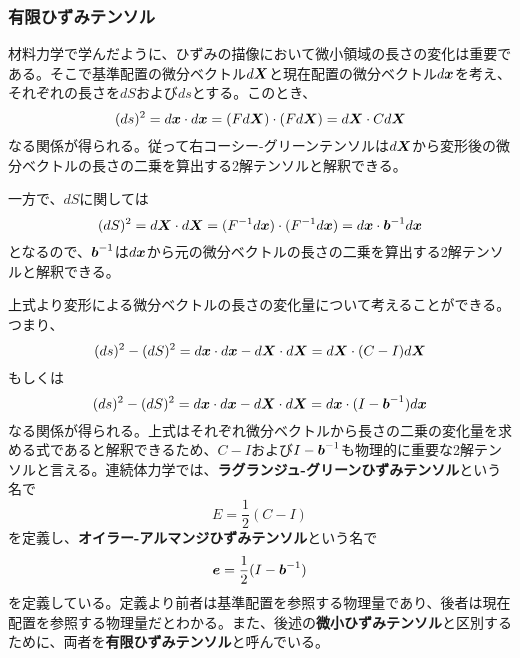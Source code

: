 \documentclass[dvipdfmx, 9pt, a4paper]{jsarticle}
\numberwithin{equation}{section}
\newcommand{\bm}[1]{{\mbox{\boldmath $#1$}}}
\begin{document}
\subsubsection{有限ひずみテンソル}
材料力学で学んだように、ひずみの描像において微小領域の長さの変化は重要である。そこで基準配置の微分ベクトル$d\bm X$と現在配置の微分ベクトル$d\bm x$を考え、それぞれの長さを$dS$および$ds$とする。このとき、
\begin{equation}
(ds)^2=d\bm x \cdot d\bm x=(Fd\bm X)\cdot (Fd\bm X)=d\bm X \cdot Cd\bm X \notag
\end{equation}
なる関係が得られる。従って右コーシー-グリーンテンソルは$d\bm X$から変形後の微分ベクトルの長さの二乗を算出する2解テンソルと解釈できる。\par
一方で、$dS$に関しては
\begin{equation}
(dS)^2=d\bm X \cdot d\bm X=(F^{-1}d\bm x)\cdot (F^{-1}d\bm x)=d\bm x \cdot \bm b^{-1}d\bm x \notag
\end{equation}
となるので、$\bm b^{-1}$は$d\bm x$から元の微分ベクトルの長さの二乗を算出する2解テンソルと解釈できる。\par
上式より変形による微分ベクトルの長さの変化量について考えることができる。つまり、
\begin{equation}
(ds)^2-(dS)^2=d\bm x\cdot d\bm x-d\bm X\cdot d\bm X=d\bm X\cdot(C-I)d\bm X \notag
\end{equation}
もしくは
\begin{equation}
(ds)^2-(dS)^2=d\bm x\cdot d\bm x-d\bm X\cdot d\bm X=d\bm x\cdot(I-\bm b^{-1})d\bm x \notag
\end{equation}
なる関係が得られる。上式はそれぞれ微分ベクトルから長さの二乗の変化量を求める式であると解釈できるため、$C-I$および$I-\bm b^{-1}$も物理的に重要な2解テンソルと言える。連続体力学では、{\bf ラグランジュ-グリーンひずみテンソル}という名で
\begin{equation}
E=\frac{1}{2}(C-I)
\end{equation}
を定義し、{\bf オイラー-アルマンジひずみテンソル}という名で
\begin{equation}
\bm e=\frac{1}{2}(I-\bm b^{-1})
\end{equation}
を定義している。定義より前者は基準配置を参照する物理量であり、後者は現在配置を参照する物理量だとわかる。また、後述の{\bf 微小ひずみテンソル}と区別するために、両者を{\bf 有限ひずみテンソル}と呼んでいる。
\end{document}
